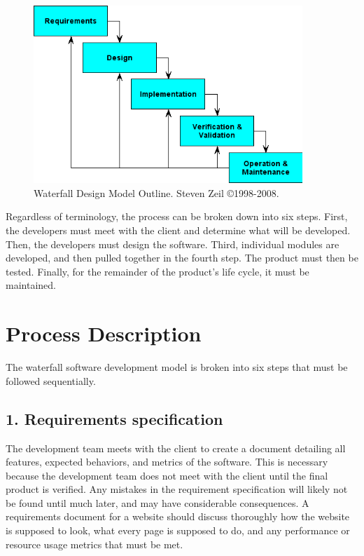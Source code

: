\documentclass[12pt,letterpaper]{article}
\begin{document}
\begin{figure}[H]
  \centering
  \caption{Waterfall Design Model Outline.  Steven Zeil \copyright 1998-2008.\label{waterfall}}
  \includegraphics[width=4in]{process_description_waterfall}
\end{figure}

Regardless of terminology, the process can be broken down into six steps.
First, the developers must meet with the client and determine what will be
developed.  Then, the developers must design the software.  Third, individual
modules are developed, and then pulled together in the fourth step.  The product
must then be tested.  Finally, for the remainder of the product's life cycle, it
must be maintained.

\section*{Process Description}
The waterfall software development model is broken into six steps that must be
followed sequentially.

\subsection*{1. Requirements specification}
The development team meets with the client to create a document detailing all
features, expected behaviors, and metrics of the software.  This is necessary
because the development team does not meet with the client until the final
product is verified.  Any mistakes in the requirement specification will likely
not be found until much later, and may have considerable consequences.  A
requirements document for a website should discuss thoroughly how the website is
supposed to look, what every page is supposed to do, and any performance or
resource usage metrics that must be met.
\end{document}
